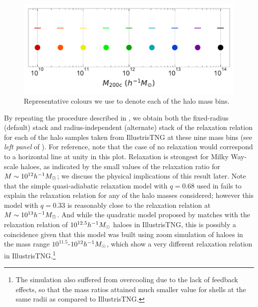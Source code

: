 \begin{figure}
    \centering
    \includegraphics[width=0.99\linewidth]{plots/Mass_bin_labels.pdf}
    \caption{Representative colours we use to denote each of the halo mass bins.}
    \label{fig:mass_bin_label-ch:simbase}
\end{figure}

By repeating the procedure described in , we obtain both the fixed-radius (default) stack and radius-independent (alternate) stack of the relaxation relation for each of the halo samples taken from IllustrisTNG at these nine mass bins (see \emph{left panel} of ). 
For reference, note that the case of no relaxation would correspond to a horizontal line at unity in this plot.
Relaxation is strongest for Milky Way-scale haloes, as indicated by the small values of the relaxation ratio for $M\sim10^{12}h^{-1}M_{\odot}$; we discuss the physical implications of this result later. 
Note that the simple quasi-adiabatic relaxation model  with $q=0.68$ used in \cite{2015JCAP...12..049S} fails to explain the relaxation relation for any of the halo masses considered; however this model with $q=0.33$ is reasonably close to the relaxation relation at %
$M\sim 10^{13} h^{-1}M_{\odot}$. 
And while the quadratic model proposed by \cite{2010MNRAS.407..435A} matches with the relaxation relation of $10^{12.5} h^{-1}M_{\odot}$ haloes in IllustrisTNG, this is possibly a coincidence given that this model was built using zoom simulation of haloes in the mass range $10^{11.5} $-$ 10^{12} h^{-1}M_{\odot}$, which show a very different relaxation relation in IllustrisTNG.\footnote{The \cite{2010MNRAS.407..435A} simulation also suffered from overcooling due to the lack of feedback effects, so that the mass ratios attained much smaller value for shells at the same radii as compared to IllustrisTNG.}

